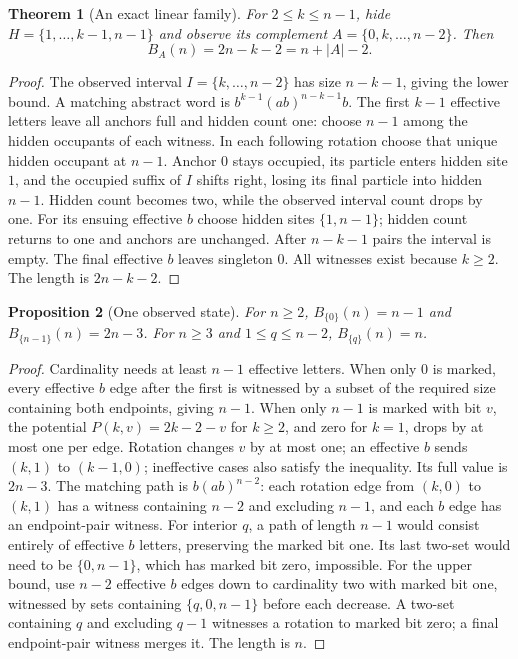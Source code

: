 \documentclass[11pt]{article}
\newtheorem{theorem}{Theorem}
\newtheorem{proposition}[theorem]{Proposition}
\begin{document}
\begin{theorem}[An exact linear family]\label{thm:linear}
For $2\le k\le n-1$, hide $H=\{1,\ldots,k-1,n-1\}$ and observe its
complement $A=\{0,k,\ldots,n-2\}$. Then
\[
B_A(n)=2n-k-2=n+|A|-2.
\]
\end{theorem}
\begin{proof}
The observed interval $I=\{k,\ldots,n-2\}$ has size $n-k-1$, giving the
lower bound. A matching abstract word is $b^{k-1}(ab)^{n-k-1}b$.
The first $k-1$ effective letters leave all anchors full and hidden count
one: choose $n-1$ among the hidden occupants of each witness. In each
following rotation choose that unique hidden occupant at $n-1$.
Anchor $0$ stays occupied, its particle enters hidden site $1$, and the
occupied suffix of $I$ shifts right, losing its final particle into hidden
$n-1$. Hidden count becomes two, while the observed interval count drops
by one. For its ensuing effective $b$ choose hidden sites $\{1,n-1\}$;
hidden count returns to one and anchors are unchanged. After $n-k-1$ pairs
the interval is empty. The final effective $b$ leaves singleton $0$.
All witnesses exist because $k\ge2$. The length is $2n-k-2$.
\end{proof}

\begin{proposition}[One observed state]
For $n\ge2$, $B_{\{0\}}(n)=n-1$ and $B_{\{n-1\}}(n)=2n-3$.
For $n\ge3$ and $1\le q\le n-2$, $B_{\{q\}}(n)=n$.
\end{proposition}
\begin{proof}
Cardinality needs at least $n-1$ effective letters. When only $0$ is
marked, every effective $b$ edge after the first is witnessed by a subset
of the required size containing both endpoints, giving $n-1$.
When only $n-1$ is marked with bit $v$, the potential
$P(k,v)=2k-2-v$ for $k\ge2$, and zero for $k=1$, drops by at most one
per edge. Rotation changes $v$ by at most one; an effective $b$ sends
$(k,1)$ to $(k-1,0)$; ineffective cases also satisfy the inequality.
Its full value is $2n-3$. The matching path is $b(ab)^{n-2}$: each rotation
edge from $(k,0)$ to $(k,1)$ has a witness containing $n-2$ and excluding
$n-1$, and each $b$ edge has an endpoint-pair witness.
For interior $q$, a path of length $n-1$ would consist entirely of
effective $b$ letters, preserving the marked bit one. Its last two-set
would need to be $\{0,n-1\}$, which has marked bit zero, impossible.
For the upper bound, use $n-2$ effective $b$ edges down to cardinality two
with marked bit one, witnessed by sets containing $\{q,0,n-1\}$ before
each decrease. A two-set containing $q$ and excluding $q-1$ witnesses a
rotation to marked bit zero; a final endpoint-pair witness merges it.
The length is $n$.
\end{proof}
\end{document}
